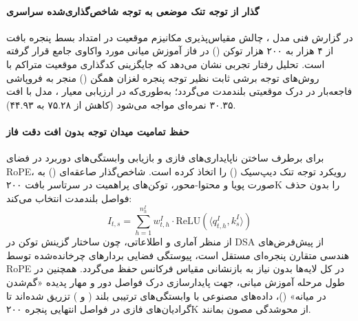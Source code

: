 \item {}

\paragraph*{گذار از توجه تنک موضعی به توجه شاخص‌گذاری‌شده سراسری}
در گزارش فنی مدل  \cite{glm2026glm5}، چالش مقیاس‌پذیری مکانیزم موقعیت در امتداد بسط پنجره بافت از ۴ هزار به ۲۰۰ هزار توکن () در فاز آموزش میانی مورد واکاوی جامع قرار گرفته است. تحلیل رفتار تجربی نشان می‌دهد که جایگزینی کدگذاری موقعیت متراکم با روش‌های توجه برشی ثابت نظیر توجه پنجره لغزان همگن () منجر به فروپاشی فاجعه‌بار در درک موقعیتی بلندمدت می‌گردد؛ به‌طوری‌که در ارزیابی معیار ، مدل با افت ۳۰.۳۵ نمره‌ای مواجه می‌شود (کاهش از ۷۵.۲۸ به ۴۴.۹۳).

\paragraph*{حفظ تمامیت میدان توجه بدون افت دقت فاز}
برای برطرف ساختن ناپایداری‌های فازی و بازیابی وابستگی‌های دوربرد در فضای RoPE،  رویکرد توجه تنک دیپ‌سیک () را اتخاذ کرده است. شاخص‌گذار صاعقه‌ای () به صورت پویا و محتوا-محور، توکن‌های پراهمیت در سرتاسر بافت ۲۰۰K را بدون حذف فواصل بلندمدت انتخاب می‌کند:
\begin{equation}
    I_{t, s} = \sum_{h=1}^{n_h^I} w_{t, h}^I \cdot \text{ReLU}\left( \langle q_{t, h}^I, k_s^I \rangle \right)
\end{equation}
از منظر آماری و اطلاعاتی، چون ساختار گزینش توکن در DSA از پیش‌فرض‌های هندسی متقارن پنجره‌ای مستقل است، پیوستگی فضایی بردارهای چرخانده‌شده توسط RoPE در کل لایه‌ها بدون نیاز به بازنشانی مقیاس فرکانس حفظ می‌گردد. همچنین در طول مرحله آموزش میانی، جهت پایدارسازی درک فواصل دور و مهار پدیده «گم‌شدن در میانه» ()، داده‌های مصنوعی با وابستگی‌های ترتیبی بلند ( و ) تزریق شده‌اند تا گرادیان‌های فازی در فواصل انتهایی پنجره ۲۰۰K از محوشدگی مصون بمانند.